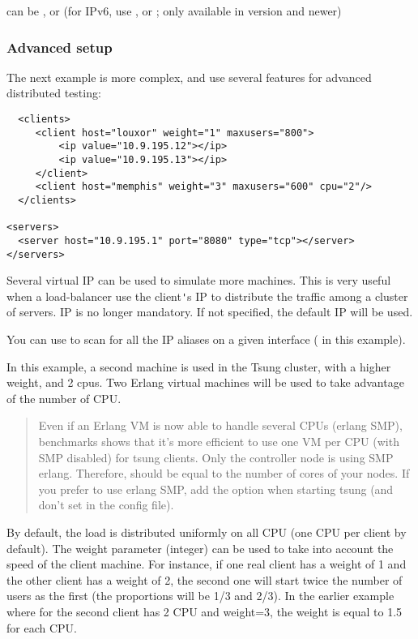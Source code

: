 \documentclass{TSUNG-en}
\begin{document}
 can be ,  or
 (for IPv6, use ,  or
 ; only available in  version  and newer)

\subsubsection{Advanced setup}

The next example is more complex, and use several features for
advanced distributed testing:

\begin{Verbatim}
  <clients>
     <client host="louxor" weight="1" maxusers="800">
         <ip value="10.9.195.12"></ip>
         <ip value="10.9.195.13"></ip>
     </client>
     <client host="memphis" weight="3" maxusers="600" cpu="2"/>
  </clients>

<servers>
  <server host="10.9.195.1" port="8080" type="tcp"></server>
</servers>
 \end{Verbatim}


Several virtual IP can be used to simulate more machines. This is
 very useful when a load-balancer use the client\verb|'|s IP to
 distribute the traffic among a cluster of servers.  IP is no longer mandatory. If not specified, the default IP will
 be used.

 You can use   to scan for all the IP aliases on a given interface
( in this example).

 In this example, a second machine is used in the Tsung cluster,
 with a higher weight, and 2 cpus. Two Erlang virtual machines will be
 used to take advantage of the number of CPU.

 \begin{quote}
  Even if an Erlang VM is now able to handle several CPUs
 (erlang SMP), benchmarks shows that it's more efficient to use one VM
 per CPU (with SMP disabled) for tsung clients. Only the controller node is using SMP
 erlang. Therefore,  should be equal to the number of cores of
 your nodes. If you prefer to use erlang SMP, add the 
 option when starting tsung (and don't set  in the config
 file).
 \end{quote}

 By default, the load is distributed uniformly on all CPU (one CPU
 per client by default). The weight parameter (integer) can be used to
 take into account the speed of the client machine. For instance, if
 one real client has a weight of 1 and the other client has a weight
 of 2, the second one will start twice the number of users as the
 first (the proportions will be 1/3 and 2/3). In the earlier example
 where for the second client has 2 CPU and weight=3, the weight is
 equal to 1.5 for each CPU.
\end{document}
